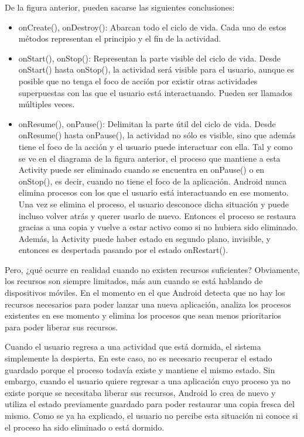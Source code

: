 \documentclass[letterpaper,12pt,openany,oneside]{book}
\begin{document}
 De la figura anterior, pueden sacarse las siguientes conclusiones:
\begin{itemize}
\item onCreate(), onDestroy(): Abarcan todo el ciclo de vida. Cada uno de estos métodos representan el principio y el fin de la actividad.
\item onStart(), onStop():  Representan la parte visible del ciclo de vida. Desde onStart() hasta onStop(), la actividad será visible para el usuario, aunque es posible que no tenga el foco de acción por existir otras actividades superpuestas con las que el usuario está interactuando. Pueden ser llamados múltiples veces.
\item onResume(), onPause(): Delimitan la parte útil del ciclo de vida. Desde onResume() hasta onPause(), la actividad no sólo es visible, sino que además tiene el foco de la acción y el usuario puede interactuar con ella. 
   Tal y como se ve en el diagrama de la figura anterior, el proceso que mantiene a esta Activity puede ser eliminado cuando se encuentra en onPause() o en onStop(), es decir, cuando no tiene el foco de la aplicación. Android nunca elimina procesos con los que el usuario está interactuando en ese momento. Una vez se elimina el proceso, el usuario desconoce dicha situación y puede incluso volver atrás y querer usarlo de nuevo. Entonces el proceso se restaura gracias a una copia y vuelve a estar activo como si no hubiera sido eliminado. Además, la Activity puede haber estado en segundo plano, invisible, y entonces es despertada pasando por el estado onRestart(). 
\end{itemize}

   Pero, ¿qué ocurre en realidad cuando no existen recursos suficientes? Obviamente, los recursos son siempre limitados, más aun cuando se está hablando de dispositivos móviles. En el momento en el que Android detecta que no hay los recursos necesarios para poder lanzar una nueva aplicación, analiza los procesos existentes en ese momento y elimina los procesos que sean menos prioritarios para poder liberar sus recursos. 

   Cuando el usuario regresa a una actividad que está dormida, el sistema simplemente la despierta. En este caso, no es necesario recuperar el estado guardado porque el proceso todavía existe y mantiene el mismo estado. Sin embargo, cuando el usuario quiere regresar a una aplicación cuyo proceso ya no existe porque se necesitaba liberar sus recursos, Android lo crea de nuevo y utiliza el estado previamente guardado para poder restaurar una copia fresca del mismo. Como se ya ha explicado, el usuario no percibe esta situación ni conoce si el proceso ha sido eliminado o está dormido.
\end{document}
